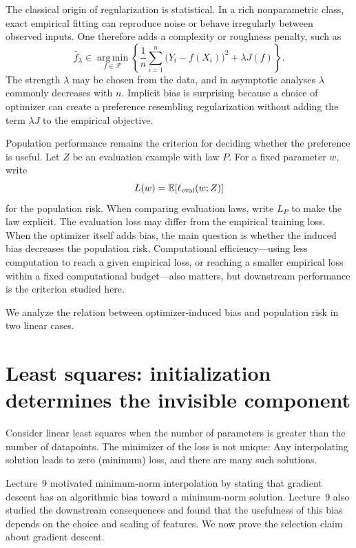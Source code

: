 \documentclass[11pt,twoside]{article}
\newcommand{\E}{\mathbb E}
\newcommand{\argmin}{\operatorname*{arg\,min}}
\theoremstyle{definition}
\theoremstyle{remark}
\begin{document}
The classical origin of regularization is statistical. In a rich
nonparametric class, exact empirical fitting can reproduce noise or behave
irregularly between observed inputs. One therefore adds a complexity or
roughness penalty, such as
\begin{equation}
 \widehat f_\lambda\in\argmin_{f\in\mathcal F}
 \left\{\frac1n\sum_{i=1}^n\bigl(Y_i-f(X_i)\bigr)^2
       +\lambda J(f)\right\}.
 \label{eq:nonparametric-regularization}
\end{equation}
The strength $\lambda$ may be chosen from the data, and in asymptotic analyses
$\lambda$ commonly decreases with $n$. Implicit bias is surprising because a
choice of optimizer can create a preference resembling regularization without
adding the term $\lambda J$ to the empirical objective.

Population performance remains the criterion for deciding whether the
preference is useful. Let $Z$ be an evaluation example with law $P$.
For a fixed parameter $w$, write
\[
 L(w)=\E[\ell_{\rm eval}(w;Z)]
\]
for the population risk. When comparing evaluation laws, write $L_P$ to
make the law explicit. The evaluation loss may differ from the empirical
training loss. When the optimizer itself adds bias, the main question is
whether the induced bias decreases the population risk. Computational
efficiency---using less computation to reach a given empirical loss, or
reaching a smaller empirical loss within a fixed computational budget---also
matters, but downstream performance is the criterion studied here.

We analyze the relation between optimizer-induced bias and population risk in
two linear cases.

\section{Least squares: initialization determines the invisible component}
\label{sec:least-squares}

Consider linear least squares when the number of parameters is greater
than the number of datapoints. The minimizer of the loss is not unique:
Any interpolating solution leads to zero (minimum) loss, and there are
many such solutions.

Lecture~9 motivated minimum-norm interpolation by stating that gradient
descent has an algorithmic bias toward a minimum-norm solution. Lecture~9
also studied the downstream consequences and found that the usefulness of
this bias depends on the choice and scaling of features. We now prove the
selection claim about gradient descent.
\end{document}
